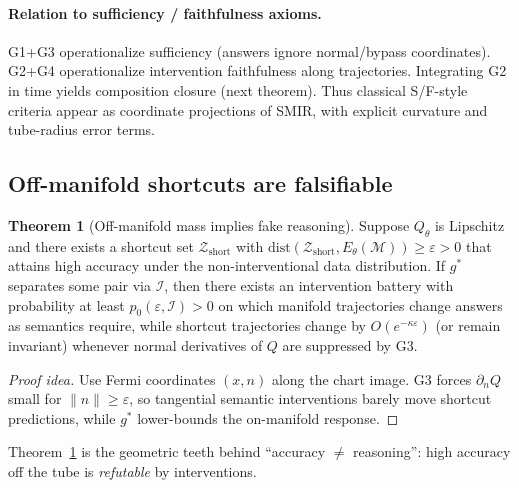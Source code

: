 \documentclass[letterpaper,10pt,twocolumn]{article}
\theoremstyle{definition}
\newtheorem{theorem}{Theorem}
\newcommand{\cM}{\mathcal{M}}
\begin{document}
\paragraph{Relation to sufficiency / faithfulness axioms.}
G1+G3 operationalize sufficiency (answers ignore normal/bypass coordinates).
G2+G4 operationalize intervention faithfulness along trajectories.
Integrating G2 in time yields composition closure (next theorem).
Thus classical S/F-style criteria appear as coordinate projections of SMIR, with explicit curvature and tube-radius error terms.

\subsection{Off-manifold shortcuts are falsifiable}
\begin{theorem}[Off-manifold mass implies fake reasoning]
\label{thm:off}
Suppose $Q_\theta$ is Lipschitz and there exists a shortcut set $\mathcal{Z}_{\mathrm{short}}$ with $\mathrm{dist}(\mathcal{Z}_{\mathrm{short}},E_\theta(\cM))\ge\varepsilon>0$ that attains high accuracy under the non-interventional data distribution.
If $g^*$ separates some pair via $\mathcal{I}$, then there exists an intervention battery with probability at least $p_0(\varepsilon,\mathcal{I})>0$ on which manifold trajectories change answers as semantics require, while shortcut trajectories change by $O(e^{-\kappa\varepsilon})$ (or remain invariant) whenever normal derivatives of $Q$ are suppressed by G3.
\end{theorem}
\begin{proof}[Proof idea]
Use Fermi coordinates $(x,n)$ along the chart image.
G3 forces $\partial_n Q$ small for $\|n\|\ge\varepsilon$, so tangential semantic interventions barely move shortcut predictions, while $g^*$ lower-bounds the on-manifold response.
\end{proof}
Theorem~\ref{thm:off} is the geometric teeth behind ``accuracy $\neq$ reasoning'': high accuracy off the tube is \emph{refutable} by interventions.
\end{document}
